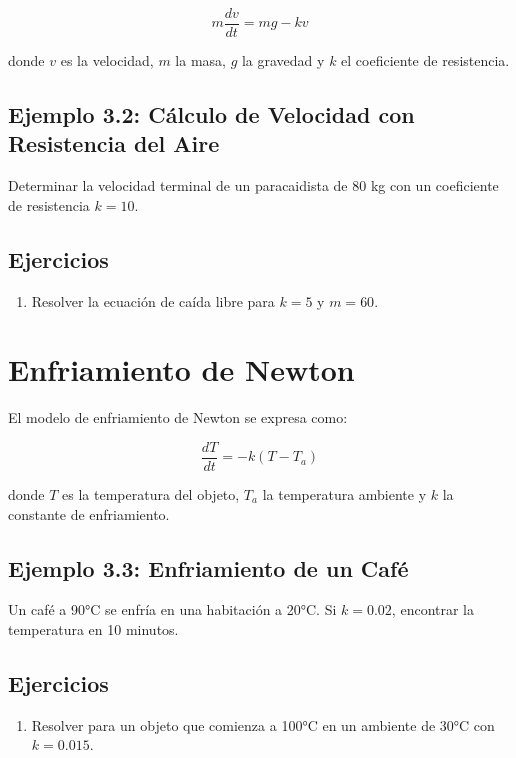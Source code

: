 \begin{equation}
m \frac{dv}{dt} = mg - kv
\end{equation}

donde \( v \) es la velocidad, \( m \) la masa, \( g \) la gravedad y \( k \) el coeficiente de resistencia.

\subsection*{Ejemplo 3.2: Cálculo de Velocidad con Resistencia del Aire}
Determinar la velocidad terminal de un paracaidista de 80 kg con un coeficiente de resistencia \( k = 10 \).

\subsection*{Ejercicios}
\begin{enumerate}
    \item Resolver la ecuación de caída libre para \( k = 5 \) y \( m = 60 \).
\end{enumerate}

\section{Enfriamiento de Newton}
El modelo de enfriamiento de Newton se expresa como:

\begin{equation}
\frac{dT}{dt} = -k (T - T_a)
\end{equation}

donde \( T \) es la temperatura del objeto, \( T_a \) la temperatura ambiente y \( k \) la constante de enfriamiento.

\subsection*{Ejemplo 3.3: Enfriamiento de un Café}
Un café a 90°C se enfría en una habitación a 20°C. Si \( k = 0.02 \), encontrar la temperatura en 10 minutos.

\subsection*{Ejercicios}
\begin{enumerate}
    \item Resolver para un objeto que comienza a 100°C en un ambiente de 30°C con \( k = 0.015 \).
\end{enumerate}

